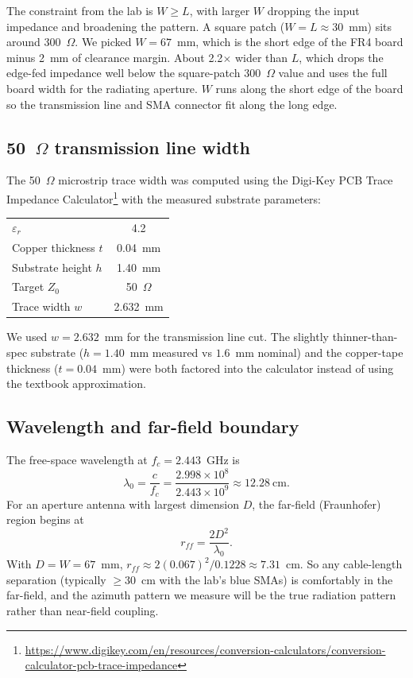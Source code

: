 \documentclass[11pt,letterpaper]{article}
\begin{document}
The constraint from the lab is $W \geq L$, with larger $W$ dropping the input impedance and broadening the pattern. A square patch ($W = L \approx 30$~mm) sits around 300~$\Omega$. We picked $W = 67$~mm, which is the short edge of the FR4 board minus 2~mm of clearance margin. About 2.2$\times$ wider than $L$, which drops the edge-fed impedance well below the square-patch 300~$\Omega$ value and uses the full board width for the radiating aperture. $W$ runs along the short edge of the board so the transmission line and SMA connector fit along the long edge.

\subsection*{50~\texorpdfstring{$\Omega$}{ohm} transmission line width}

The 50~$\Omega$ microstrip trace width was computed using the Digi-Key PCB Trace Impedance Calculator\footnote{\url{https://www.digikey.com/en/resources/conversion-calculators/conversion-calculator-pcb-trace-impedance}} with the measured substrate parameters:

\begin{center}
\begin{tabular}{lc}
\toprule
$\varepsilon_r$         & 4.2 \\
Copper thickness $t$    & 0.04~mm \\
Substrate height $h$    & 1.40~mm \\
Target $Z_0$            & 50~$\Omega$ \\
\midrule
Trace width $w$         & 2.632~mm \\
\bottomrule
\end{tabular}
\end{center}

We used $w = 2.632$~mm for the transmission line cut. The slightly thinner-than-spec substrate ($h = 1.40$~mm measured vs $1.6$~mm nominal) and the copper-tape thickness ($t = 0.04$~mm) were both factored into the calculator instead of using the textbook approximation.

\subsection*{Wavelength and far-field boundary}

The free-space wavelength at $f_c = 2.443$~GHz is
\[
\lambda_0 = \frac{c}{f_c} = \frac{2.998\times 10^{8}}{2.443\times 10^{9}} \approx 12.28~\text{cm}.
\]
For an aperture antenna with largest dimension $D$, the far-field (Fraunhofer) region begins at
\[
r_{ff} = \frac{2 D^2}{\lambda_0}.
\]
With $D = W = 67$~mm, $r_{ff} \approx 2(0.067)^2/0.1228 \approx 7.31$~cm. So any cable-length separation (typically $\geq 30$~cm with the lab's blue SMAs) is comfortably in the far-field, and the azimuth pattern we measure will be the true radiation pattern rather than near-field coupling.
\end{document}
